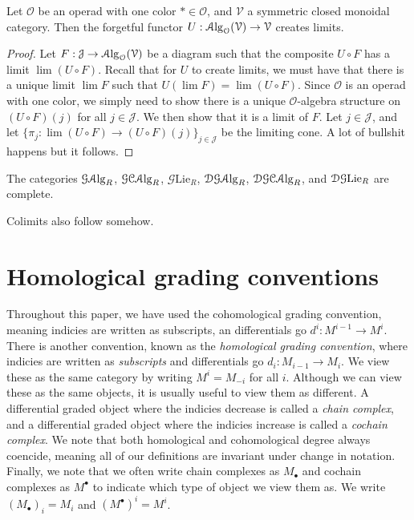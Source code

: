 \begin{proposition}\label{2.4.6}
	Let $\mathcal{O} $ be an operad with one color $*\in \mathcal{O} $, and $\mathcal{V} $ a symmetric closed monoidal category. Then the forgetful functor $U : \mathcal{A}\mathrm{lg}_{\mathcal{O} } (\mathcal{V} ) \to \mathcal{V} $ creates limits.
\end{proposition}
\begin{proof}
	Let $F : \mathcal{J}  \to \mathcal{A}\mathrm{lg}_{\mathcal{O} } (\mathcal{V} )$ be a diagram such that the composite $U\circ F$ has a limit $\lim (U\circ F)$. Recall that for $U$ to create limits, we must have that there is a unique limit $\lim F$ such that $U(\lim F) = \lim (U\circ F)$. Since $\mathcal{O} $ is an operad with one color, we simply need to show there is a unique $\mathcal{O} $-algebra structure on $(U\circ F)(j)$ for all $j\in \mathcal{J} $. We then show that it is a limit of $F$. Let $j\in \mathcal{J} $, and let $\{\pi_j : \lim (U\circ F) \to (U\circ F)(j)\}_{j\in \mathcal{J} } $ be the limiting cone. A lot of bullshit happens but it follows.
\end{proof}

\begin{corollary}\label{2.4.7}
	The categories $\mathcal{G} \mathcal{A}\mathrm{lg}_{R} $, $\mathcal{G} \mathcal{C} \mathcal{A}\mathrm{lg}_{R} $, $\mathcal{G}\mathrm{Lie } _R$, $\mathcal{DG}\mathcal{A}\mathrm{lg}_{R} $, $\mathcal{DG} \mathcal{C} \mathcal{A}\mathrm{lg}_{R} $, and $\mathcal{DG}\mathrm{Lie}_R$ are complete.
\end{corollary}

Colimits also follow somehow.

\section{Homological grading conventions}

Throughout this paper, we have used the cohomological grading convention, meaning indicies are written as subscripts, an differentials go $d^i : M^{i-1}  \to M^i$. There is another convention, known as the \emph{homological grading convention}, where indicies are written as \emph{subscripts} and differentials go $d_i : M_{i-1} \to M_{i} $. We view these as the same category by writing $M^i = M_{-i} $ for all $i$. Although we can view these as the same objects, it is usually useful to view them as different. A differential graded object where the indicies decrease is called a \emph{chain complex}, and a differential graded object where the indicies increase is called a \emph{cochain complex}. We note that both homological and cohomological degree always coencide, meaning all of our definitions are invariant under change in notation. Finally, we note that we often write chain complexes as $M_{\bullet} $ and cochain complexes as $M^{\bullet} $ to indicate which type of object we view them as. We write $(M_{\bullet} )_i = M_i$ and $(M^{\bullet} )^i =M^i$.

